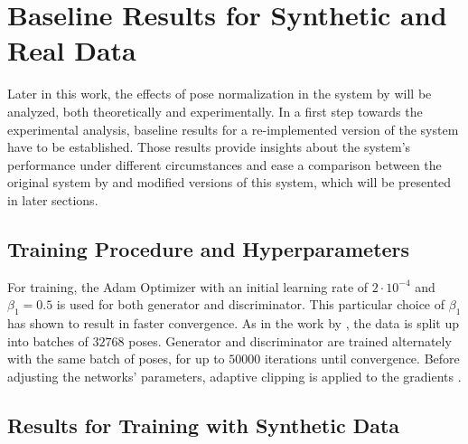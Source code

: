 \section{Baseline Results for Synthetic and Real Data}
\label{sec:evaluation}

Later in this work, the effects of pose normalization in the system by \citet{drover18} will be analyzed, both theoretically and experimentally.
In a first step towards the experimental analysis, baseline results for a re-implemented version of the system have to be established.
Those results provide insights about the system's performance under different circumstances and ease a comparison between the original system by \citet{drover18} and modified versions of this system, which will be presented in later sections.

\subsection{Training Procedure and Hyperparameters}
For training, the Adam Optimizer \cite{kingma17} with an initial learning rate of $2 \cdot 10^{-4}$ and $\beta_1 = 0.5$ is used for both generator and discriminator.
This particular choice of $\beta_1$ has shown to result in faster convergence.
As in the work by \citet{drover18}, the data is split up into batches of $32768$ poses.
Generator and discriminator are trained alternately with the same batch of poses, for up to $50000$ iterations until convergence.
Before adjusting the networks' parameters, adaptive clipping is applied to the gradients \cite[Section~3.2.1]{chorowski14}.


\subsection{Results for Training with Synthetic Data}
\label{sec:results-synthetic}

